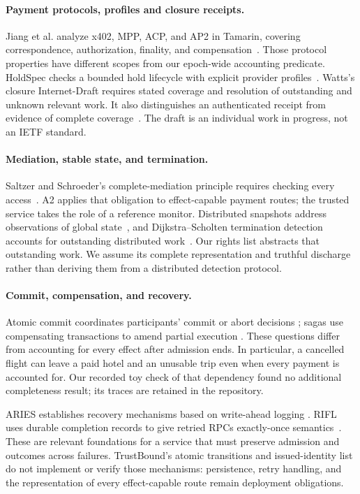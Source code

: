 \documentclass[letterpaper]{article}
\begin{document}
\paragraph{Payment protocols, profiles and closure receipts.}
Jiang et al. analyze x402, MPP, ACP, and AP2 in Tamarin, covering correspondence,
authorization, finality, and compensation~\citep{protocolanalysis}. Those protocol
properties have different scopes from our epoch-wide accounting predicate.
HoldSpec checks a bounded hold lifecycle with explicit provider
profiles~\citep{hold}. Watts's closure Internet-Draft requires stated coverage
and resolution of outstanding and unknown relevant work. It also distinguishes
an authenticated receipt from evidence of complete coverage~\citep{closuredraft}.
The draft is an individual work in progress, not an IETF standard.

\paragraph{Mediation, stable state, and termination.}
Saltzer and Schroeder's complete-mediation principle requires checking every
access~\citep{saltzer1975}. A2 applies that obligation to effect-capable payment
routes; the trusted service takes the role of a reference monitor. Distributed
snapshots address observations of global state~\citep{chandy}, and
Dijkstra--Scholten termination detection accounts for outstanding distributed
work~\citep{dijkstra1980}. Our rights list abstracts that outstanding work. We
assume its complete representation and truthful discharge rather than deriving
them from a distributed detection protocol.

\paragraph{Commit, compensation, and recovery.}
Atomic commit coordinates participants' commit or abort decisions
\citep{gray2006}; sagas use compensating transactions to amend partial execution
\citep{sagas1987}. These questions differ from accounting for every effect after
admission ends. In particular, a cancelled flight can leave a paid hotel and
an unusable trip even when every payment is accounted for. Our recorded toy
check of that dependency found no additional completeness result; its traces
are retained in the repository.

ARIES establishes recovery mechanisms based on write-ahead logging
\citep{aries1992}. RIFL uses durable completion records to give retried RPCs
exactly-once semantics~\citep{rifl2015}. These are relevant foundations for a
service that must preserve admission and outcomes across failures. TrustBound's
atomic transitions and issued-identity list do not implement or verify those
mechanisms: persistence, retry handling, and the representation of every
effect-capable route remain deployment obligations.
\end{document}
